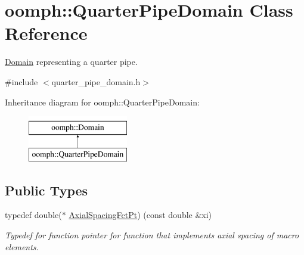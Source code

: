 \hypertarget{classoomph_1_1QuarterPipeDomain}{}\section{oomph\+:\+:Quarter\+Pipe\+Domain Class Reference}
\label{classoomph_1_1QuarterPipeDomain}


\hyperlink{classoomph_1_1Domain}{Domain} representing a quarter pipe.  




{\ttfamily \#include $<$quarter\+\_\+pipe\+\_\+domain.\+h$>$}

Inheritance diagram for oomph\+:\+:Quarter\+Pipe\+Domain\+:\begin{figure}[H]
\begin{center}
\leavevmode
\includegraphics[height=2.000000cm]{classoomph_1_1QuarterPipeDomain}
\end{center}
\end{figure}
\subsection*{Public Types}
\begin{DoxyCompactItemize}
\item 
typedef double($\ast$ \hyperlink{classoomph_1_1QuarterPipeDomain_a540d441b38146aacb12938d5f885789c}{Axial\+Spacing\+Fct\+Pt}) (const double \&xi)
\begin{DoxyCompactList}\small\item\em Typedef for function pointer for function that implements axial spacing of macro elements. \end{DoxyCompactList}\end{DoxyCompactItemize}
